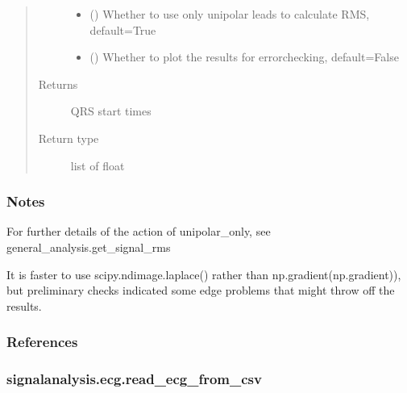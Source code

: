 \documentclass[letterpaper,10pt,english]{sphinxmanual}
\begin{document}
\begin{fulllineitems}
\begin{quote}
\begin{description}
\begin{itemize}
\item {} 
\sphinxAtStartPar
{} (\sphinxstyleliteralemphasis{\sphinxupquote{, }}) \textendash{} Whether to use only unipolar leads to calculate RMS, default=True

\item {} 
\sphinxAtStartPar
{} (\sphinxstyleliteralemphasis{\sphinxupquote{, }}) \textendash{} Whether to plot the results for error\sphinxhyphen{}checking, default=False

\end{itemize}

\item[{Returns}] \leavevmode
\sphinxAtStartPar
{} \textendash{} QRS start times

\item[{Return type}] \leavevmode
\sphinxAtStartPar
list of float

\end{description}\end{quote}
\subsubsection*{Notes}

\sphinxAtStartPar
For further details of the action of unipolar\_only, see general\_analysis.get\_signal\_rms

\sphinxAtStartPar
It is faster to use scipy.ndimage.laplace() rather than np.gradient(np.gradient)), but preliminary checks
indicated some edge problems that might throw off the results.
\subsubsection*{References}

\end{fulllineitems}



\subsubsection{signalanalysis.ecg.read\_ecg\_from\_csv}
\label{\detokenize{_autosummary/signalanalysis.ecg.read_ecg_from_csv:signalanalysis-ecg-read-ecg-from-csv}}\label{\detokenize{_autosummary/signalanalysis.ecg.read_ecg_from_csv::doc}}
\end{document}
